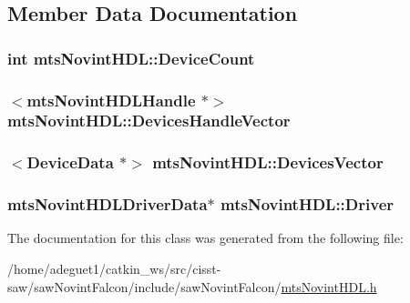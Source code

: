 \subsection{Member Data Documentation}
\hypertarget{classmts_novint_h_d_l_a7e7e29f297ded7d1c14a92fab0df7ca0}{
\subsubsection[{Device\-Count}]{\setlength{\rightskip}{0pt plus 5cm}int mts\-Novint\-H\-D\-L\-::\-Device\-Count}}\label{classmts_novint_h_d_l_a7e7e29f297ded7d1c14a92fab0df7ca0}
\hypertarget{classmts_novint_h_d_l_a63c863bb97b427554c3647a1bfc5cbca}{
\subsubsection[{Devices\-Handle\-Vector}]{$<$mts\-Novint\-H\-D\-L\-Handle $\ast$$>$ mts\-Novint\-H\-D\-L\-::\-Devices\-Handle\-Vector\hspace{0.3cm}{\ttfamily [protected]}}}\label{classmts_novint_h_d_l_a63c863bb97b427554c3647a1bfc5cbca}
\hypertarget{classmts_novint_h_d_l_a7f19ef6b35fd78933bb09d8adeedf986}{
\subsubsection[{Devices\-Vector}]{$<${\bf Device\-Data} $\ast$$>$ mts\-Novint\-H\-D\-L\-::\-Devices\-Vector\hspace{0.3cm}{\ttfamily [protected]}}}\label{classmts_novint_h_d_l_a7f19ef6b35fd78933bb09d8adeedf986}
\hypertarget{classmts_novint_h_d_l_a8eeac12be5c50e55c932e88fea791632}{
\subsubsection[{Driver}]{\setlength{\rightskip}{0pt plus 5cm}mts\-Novint\-H\-D\-L\-Driver\-Data$\ast$ mts\-Novint\-H\-D\-L\-::\-Driver\hspace{0.3cm}{\ttfamily [protected]}}}\label{classmts_novint_h_d_l_a8eeac12be5c50e55c932e88fea791632}


The documentation for this class was generated from the following file\-:\begin{DoxyCompactItemize}
\item 
/home/adeguet1/catkin\-\_\-ws/src/cisst-\/saw/saw\-Novint\-Falcon/include/saw\-Novint\-Falcon/\hyperlink{mts_novint_h_d_l_8h}{mts\-Novint\-H\-D\-L.\-h}\end{DoxyCompactItemize}
